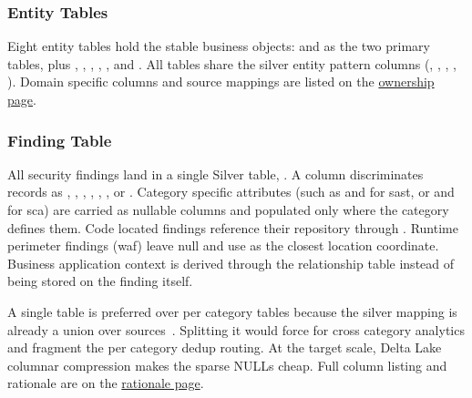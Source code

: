 

\subsubsection{Entity Tables}

Eight entity tables hold the stable business objects:  and  as the two primary tables, plus , , , , , and . All tables share the silver entity pattern columns (, , , , ). Domain specific columns and source mappings are listed on the \href{https://vkraus.github.io/appsec-mvp/platform/reference/silver-table-ownership/}{ownership page}.

\subsubsection{Finding Table}
\label{sec:silver-findings-design}

All security findings land in a single Silver table, . A  column discriminates records as , , , , , , or . Category specific attributes (such as  and  for \gls{sast}, or  and  for \gls{sca}) are carried as nullable columns and populated only where the category defines them. Code located findings reference their repository through . Runtime perimeter findings (\gls{waf}) leave  null and use  as the closest location coordinate. Business application context is derived through the  relationship table instead of being stored on the finding itself.

A single table is preferred over per category tables because the silver mapping is already a union over sources~\parencite{Kimball2013}. Splitting it would force  for cross category analytics and fragment the per category dedup routing. At the target scale, Delta Lake columnar compression makes the sparse NULLs cheap. Full column listing and rationale are on the \href{https://vkraus.github.io/appsec-mvp/platform/reference/single-silver-findings-rationale/}{rationale page}.

